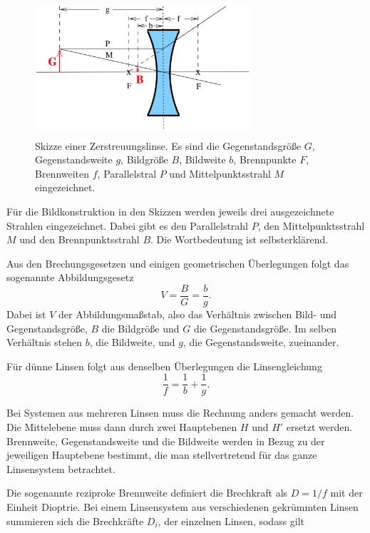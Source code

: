 \begin{figure}
    \centering
    \includegraphics[width=8cm, height=5cm]{build/streulinse.png}
    \caption{Skizze einer Zerstreuungslinse. Es sind die Gegenstandsgröße $G$, Gegenstandsweite $g$, Bildgröße $B$, Bildweite $b$, Brennpunkte $F$, Brennweiten $f$, Parallelstral $P$ und Mittelpunktsstrahl $M$ eingezeichnet. \cite{V408}}
    \label{streulinse}
\end{figure}

\noindent Für die Bildkonstruktion in den Skizzen werden jeweils drei ausgezeichnete Strahlen eingezeichnet. Dabei gibt es den Parallelstrahl $P$, den Mittelpunktsstrahl $M$ und den Brennpunktsstrahl $B$. Die Wortbedeutung ist selbsterklärend.

\noindent Aus den Brechungsgesetzen und einigen geometrischen Überlegungen folgt das sogenannte Abbildungsgesetz
\begin{equation}
    V = \frac{B}{G} = \frac{b}{g}.
    \label{eqn:abbildungsgesetz}
\end{equation}
\noindent Dabei ist $V$ der Abbildungsmaßstab, also das Verhältnis zwischen Bild- und Gegenstandsgröße, $B$ die Bildgröße und $G$ die Gegenstandsgröße. Im selben Verhältnis stehen $b$, die Bildweite, und $g$, die Gegenstandsweite, zueinander. 

\noindent Für dünne Linsen folgt aus denselben Überlegungen die Linsengleichung 
\begin{equation}
    \frac{1}{f}= \frac{1}{b} + \frac{1}{g}.
    \label{eqn:linsengleichung}
\end{equation}

\noindent Bei Systemen aus mehreren Linsen muss die Rechnung anders gemacht werden. 
Die Mittelebene muss dann durch zwei Hauptebenen $H$ und $H'$ ersetzt werden.
Brennweite, Gegenstandsweite und die Bildweite werden in Bezug zu der jeweiligen Hauptebene bestimmt, die man stellvertretend für das ganze Linsensystem betrachtet. 

\noindent Die sogenannte reziproke Brennweite definiert die Brechkraft als $D= 1/f$ mit der Einheit Dioptrie. Bei einem Linsensystem aus verschiedenen gekrümmten Linsen summieren sich die Brechkräfte $D_i$, der einzelnen Linsen, sodass gilt 

